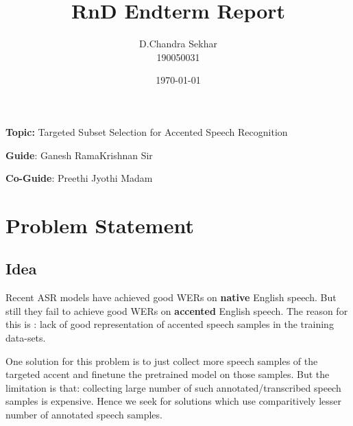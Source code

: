 \documentclass[12pt, a4paper, twoside]{article}
\title{RnD Endterm Report}
\author{D.Chandra Sekhar \\[4pt] 190050031}
\date{\today}
\begin{document}
\maketitle
\vspace{5cm}
\begin{center}
    {\large \textbf{Topic:} Targeted Subset Selection for Accented Speech Recognition \par}
    \vspace{10pt}
    {\large \textbf{Guide}: Ganesh RamaKrishnan Sir \par}
    \vspace{10pt}
    {\large \textbf{Co-Guide}: Preethi Jyothi Madam \par}
    
\end{center}
\thispagestyle{empty}
\newpage
\tableofcontents
\thispagestyle{empty}
\clearpage

\section{Problem Statement}
\subsection{Idea}
Recent ASR models have achieved good WERs on \textbf{native} English speech. But still they fail to achieve good WERs on \textbf{accented} English speech.
The reason for this is : lack of good representation of accented speech samples in the training data-sets.

One solution for this problem is to just collect more speech samples of the targeted accent and finetune the pretrained model on those samples.
But the limitation is that:  collecting large number of such annotated/transcribed speech samples is expensive.
Hence we seek for solutions which use comparitively lesser number of annotated speech samples.
\end{document}
